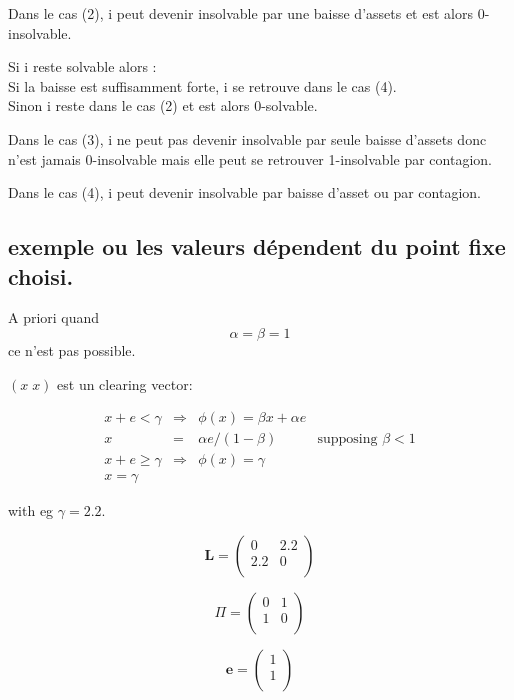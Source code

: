 \documentclass{article}
\def\AR#1{
\[
\begin{array}{llllllll}
#1
\end{array}
\]
}
\begin{document}
Dans le cas (2), i peut devenir insolvable par une baisse d'assets et est alors 0-insolvable.

Si i reste solvable alors :\\
Si la baisse est suffisamment forte, i se retrouve dans le cas (4).\\
Sinon i reste dans le cas (2) et est alors 0-solvable.

Dans le cas (3), i ne peut pas devenir insolvable par seule baisse d'assets donc n'est jamais 0-insolvable mais elle peut se retrouver 1-insolvable par contagion.

Dans le cas (4), i peut devenir insolvable par baisse d'asset ou par contagion.


\subsection{exemple ou les valeurs dépendent du point fixe choisi.}

A priori quand $$\alpha=\beta=1$$ ce n'est pas possible.

$(x\; x)$ est un clearing vector:
\AR{
x + e < \gamma
&\Rightarrow& 
\phi(x) = \beta x + \alpha e
\\
x  &=& 
\alpha e/(1 - \beta)
& \text{supposing } \beta<1
\\
x + e \geq \gamma 
&\Rightarrow& 
\phi(x) = \gamma
\\
x = \gamma
}
with eg $\gamma=2.2$.  

\begin{equation*}
\textbf{L} = 
\begin{pmatrix}
0 & 2.2 \\
2.2 & 0 \\
\end{pmatrix}
\end{equation*}

\begin{equation*}
\Pi = 
\begin{pmatrix}
0 & 1 \\
1 & 0 \\
\end{pmatrix}
\end{equation*}

\begin{equation*}
\textbf{e} = 
\begin{pmatrix}
1 \\
1 \\
\end{pmatrix}
\end{equation*}
\end{document}

